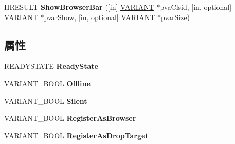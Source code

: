 \begin{DoxyCompactItemize}
\item 
\mbox{\label{interface_s_h_doc_vw_1_1uuid_a90ac871f5fe1d4c60b49d23f3561b5f2}} 
H\+R\+E\+S\+U\+LT {\bfseries Show\+Browser\+Bar} (\mbox{[}in\mbox{]} \hyperlink{structtag_v_a_r_i_a_n_t}{V\+A\+R\+I\+A\+NT} $\ast$pva\+Clsid, \mbox{[}in, optional\mbox{]} \hyperlink{structtag_v_a_r_i_a_n_t}{V\+A\+R\+I\+A\+NT} $\ast$pvar\+Show, \mbox{[}in, optional\mbox{]} \hyperlink{structtag_v_a_r_i_a_n_t}{V\+A\+R\+I\+A\+NT} $\ast$pvar\+Size)
\end{DoxyCompactItemize}
\subsection*{属性}
\begin{DoxyCompactItemize}
\item 
\mbox{\label{interface_s_h_doc_vw_1_1uuid_a18362d5f88f43443d356f985f3089f2a}} 
R\+E\+A\+D\+Y\+S\+T\+A\+TE {\bfseries Ready\+State}
\item 
\mbox{\label{interface_s_h_doc_vw_1_1uuid_adc0130e03c5dc7a78ae14b8d1a031bed}} 
V\+A\+R\+I\+A\+N\+T\+\_\+\+B\+O\+OL {\bfseries Offline}
\item 
\mbox{\label{interface_s_h_doc_vw_1_1uuid_a5e1e6ce7bb5832e8be051fe3eb3fca39}} 
V\+A\+R\+I\+A\+N\+T\+\_\+\+B\+O\+OL {\bfseries Silent}
\item 
\mbox{\label{interface_s_h_doc_vw_1_1uuid_aa0d94265596534dc271e7400af76bd5e}} 
V\+A\+R\+I\+A\+N\+T\+\_\+\+B\+O\+OL {\bfseries Register\+As\+Browser}
\item 
\mbox{\label{interface_s_h_doc_vw_1_1uuid_a846431d0b966645a820dd0a00c5d3f37}} 
V\+A\+R\+I\+A\+N\+T\+\_\+\+B\+O\+OL {\bfseries Register\+As\+Drop\+Target}

\end{DoxyCompactItemize}
